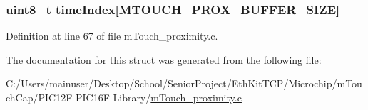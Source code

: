 \subsubsection[{time\+Index}]{\setlength{\rightskip}{0pt plus 5cm}uint8\+\_\+t time\+Index\mbox{[}M\+T\+O\+U\+C\+H\+\_\+\+P\+R\+O\+X\+\_\+\+B\+U\+F\+F\+E\+R\+\_\+\+S\+I\+Z\+E\mbox{]}}\label{structm_touch___prox___variables_a38d7d57a2a2c5314834d62a066a3613c}


Definition at line 67 of file m\+Touch\+\_\+proximity.\+c.



The documentation for this struct was generated from the following file\+:\begin{DoxyCompactItemize}
\item 
C\+:/\+Users/mainuser/\+Desktop/\+School/\+Senior\+Project/\+Eth\+Kit\+T\+C\+P/\+Microchip/m\+Touch\+Cap/\+P\+I\+C12\+F P\+I\+C16\+F Library/\hyperlink{m_touch__proximity_8c}{m\+Touch\+\_\+proximity.\+c}\end{DoxyCompactItemize}
